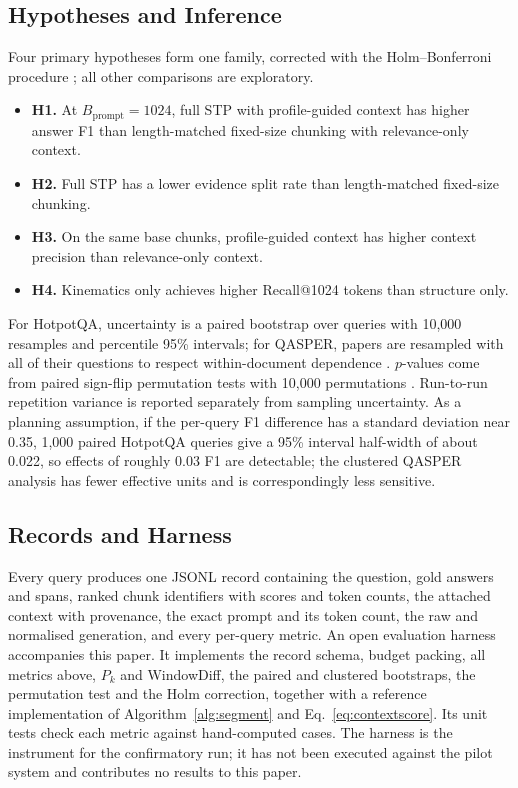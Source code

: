 \documentclass[10pt,a4paper]{article}
\begin{document}
\subsection{Hypotheses and Inference}
Four primary hypotheses form one family, corrected with the Holm--Bonferroni procedure \cite{holm1979simple}; all other comparisons are exploratory.
\begin{itemize}
  \item \textbf{H1.} At $B_{\mathrm{prompt}}=1024$, full STP with profile-guided context has higher answer F1 than length-matched fixed-size chunking with relevance-only context.
  \item \textbf{H2.} Full STP has a lower evidence split rate than length-matched fixed-size chunking.
  \item \textbf{H3.} On the same base chunks, profile-guided context has higher context precision than relevance-only context.
  \item \textbf{H4.} Kinematics only achieves higher Recall@1024 tokens than structure only.
\end{itemize}
For HotpotQA, uncertainty is a paired bootstrap over queries with 10,000 resamples and percentile 95\% intervals; for QASPER, papers are resampled with all of their questions to respect within-document dependence \cite{efron1993bootstrap,field2007bootstrapping}. $p$-values come from paired sign-flip permutation tests with 10,000 permutations \cite{dror2018hitchhiker}. Run-to-run repetition variance is reported separately from sampling uncertainty. As a planning assumption, if the per-query F1 difference has a standard deviation near 0.35, 1,000 paired HotpotQA queries give a 95\% interval half-width of about 0.022, so effects of roughly 0.03 F1 are detectable; the clustered QASPER analysis has fewer effective units and is correspondingly less sensitive.

\subsection{Records and Harness}
Every query produces one JSONL record containing the question, gold answers and spans, ranked chunk identifiers with scores and token counts, the attached context with provenance, the exact prompt and its token count, the raw and normalised generation, and every per-query metric. An open evaluation harness accompanies this paper. It implements the record schema, budget packing, all metrics above, $P_k$ and WindowDiff, the paired and clustered bootstraps, the permutation test and the Holm correction, together with a reference implementation of Algorithm~\ref{alg:segment} and Eq.~\eqref{eq:contextscore}. Its unit tests check each metric against hand-computed cases. The harness is the instrument for the confirmatory run; it has not been executed against the pilot system and contributes no results to this paper.
\end{document}

